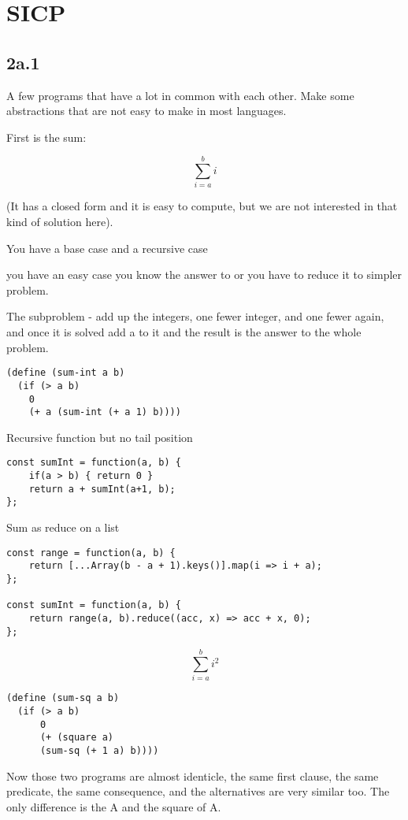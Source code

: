 \documentclass[11pt]{article}
\author{val}
\date{\today}
\title{}
\begin{document}
\tableofcontents

\section{SICP}
\label{sec:org3623d1f}
\subsection{2a.1}
\label{sec:org9ad1692}
A few programs that have a lot in common with each other.
Make some abstractions that are not easy to make in most languages.

First is the sum:

$$ \sum_{i=a}^{b} i $$

(It has a closed form and it is easy to compute,
but we are not interested in that kind of solution here).

You have a base case and a recursive case

you have an easy case you know the answer to or you have to
reduce it to simpler problem.

The subproblem - add up the integers, one fewer integer, and one fewer
again, and once it is solved add a to it and the result is the answer
to the whole problem. 

\begin{verbatim}
(define (sum-int a b)
  (if (> a b)
    0
    (+ a (sum-int (+ a 1) b))))
\end{verbatim}

Recursive function but no tail position
\begin{verbatim}
const sumInt = function(a, b) {
    if(a > b) { return 0 }
    return a + sumInt(a+1, b);
};
\end{verbatim}

Sum as reduce on a list
\begin{verbatim}
const range = function(a, b) {
    return [...Array(b - a + 1).keys()].map(i => i + a);
};

const sumInt = function(a, b) {
    return range(a, b).reduce((acc, x) => acc + x, 0);
};
\end{verbatim}


$$ \sum_{i=a}^{b} i^{2} $$

\begin{verbatim}
(define (sum-sq a b)
  (if (> a b)
      0
      (+ (square a)
      (sum-sq (+ 1 a) b))))
\end{verbatim}

Now those two programs are almost identicle, the same first clause,
the same predicate, the same consequence, and the alternatives are very
similar too. The only difference is the A and the square of A.
\end{document}
